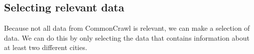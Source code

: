 \subsection{Selecting relevant data}
Because not all data from  CommonCrawl is relevant, we can make a selection of data. We can do this by only selecting the data that contains information about at least two different cities.

\\
\\
\\